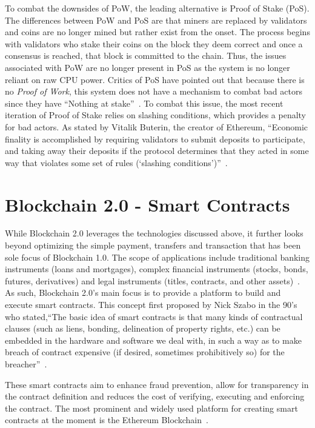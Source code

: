 To combat the downsides of PoW, the leading alternative is Proof of Stake (PoS). The differences between PoW and PoS are that miners are replaced by validators and coins are no longer mined but rather exist from the onset. The process begins with validators who stake their coins on the block they deem correct and once a consensus is reached, that block is committed to the chain. Thus, the issues associated with PoW are no longer present in PoS as the system is no longer reliant on raw CPU power.  Critics of PoS have pointed out that because there is no \emph{Proof of Work}, this system does not have a mechanism to combat bad actors since they have ``Nothing at stake''~\cite{hid-sp18-414-www-pow-vs-pos}. To combat this issue, the most recent iteration of Proof of Stake relies on slashing conditions, which provides a penalty for bad actors. As stated by Vitalik Buterin, the creator of Ethereum, ``Economic finality is accomplished by requiring validators to submit deposits to participate, and taking away their deposits if the protocol determines that they acted in some way that violates some set of rules (‘slashing conditions')''~\cite{hid-sp18-414-www-pow-vs-pos}.



\section{Blockchain 2.0 - Smart Contracts}

While Blockchain 2.0 leverages the technologies discussed above, it further looks beyond optimizing the simple payment, transfers and transaction that has been sole focus of Blockchain 1.0.  The scope of applications include traditional banking instruments (loans and mortgages), complex financial instruments (stocks, bonds, futures, derivatives) and legal instruments (titles, contracts, and other assets)~\cite{hid-sp18-414-www-promise-bitcoin-blockchain}. As such, Blockchain 2.0's main focus is to provide a platform to build and execute smart contracts. This concept first proposed by Nick Szabo in the 90's who stated,``The basic idea of smart contracts is that many kinds of contractual clauses (such as liens, bonding, delineation of property rights, etc.) can be embedded in the hardware and software we deal with, in such a way as to make breach of contract expensive (if desired, sometimes prohibitively so) for the breacher''~\cite{hid-sp18-414-www-blockchain-theory-application}.

These smart contracts aim to enhance fraud prevention, allow for transparency in the contract definition and reduces the cost of verifying, executing and enforcing the contract. The most prominent and widely used platform for creating smart contracts at the moment is the Ethereum Blockchain~\cite{hid-sp18-414-www-blockchain-evolution}.

